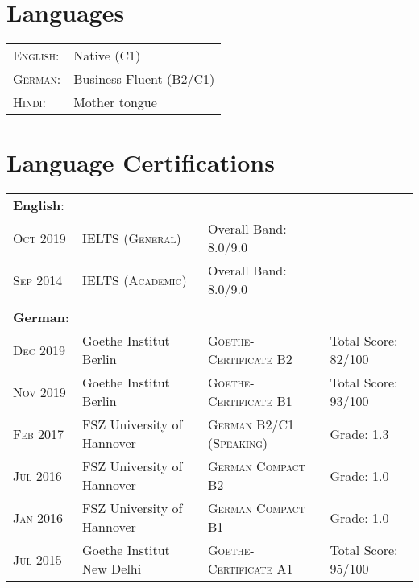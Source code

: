 \documentclass[a4paper,10pt]{article} %
\begin{document}
\section{Languages}

\begin{tabular}{ll}
\textsc{English:} & Native (C1)\\

\textsc{German:} & Business Fluent (B2/C1)\\

\textsc{Hindi:} & Mother tongue\\
\end{tabular}


\section{Language Certifications}

\begin{tabular}{llll}
\textbf{English}: & & &\\
\textsc{Oct 2019} & \textsc{IELTS (General)} & Overall Band: 8.0/9.0 &\\
\textsc{Sep 2014} & \textsc{IELTS (Academic)} & Overall Band: 8.0/9.0 &\\
\\
\textbf{German:} & & &\\
\textsc{Dec 2019} & Goethe Institut Berlin & \textsc{Goethe-Certificate B2} & Total Score: 82/100\\
\textsc{Nov 2019} & Goethe Institut Berlin & \textsc{Goethe-Certificate B1} & Total Score: 93/100\\
\textsc{Feb 2017} & FSZ University of Hannover & \textsc{German B2/C1 (Speaking)} & Grade: 1.3\\ 
\textsc{Jul 2016} & FSZ University of Hannover & \textsc{German Compact B2} & Grade: 1.0\\ 
\textsc{Jan 2016} & FSZ University of Hannover & \textsc{German Compact B1} & Grade: 1.0\\ 
\textsc{Jul 2015} & Goethe Institut New Delhi & \textsc{Goethe-Certificate A1} & Total Score: 95/100\\

\end{tabular}

\end{document}
